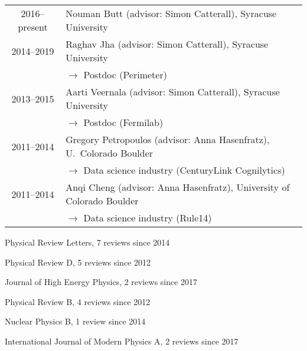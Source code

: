 \documentclass[10 pt]{article}
\renewcommand{\section}[2]%
    {\pagebreak[2]\vspace{1.3\baselineskip}%
     \hspace{0in}%
     \marginpar{
     \raggedright \scshape #1}#2}
\newenvironment{tightlistout}
  {\begin{list} {} {\setlength{\topsep}{-8 pt} \setlength{\itemsep}{-3 pt} \setlength{\leftmargin}{0 mm}}}{\end{list}}
\newcommand{\blankline}{\quad\pagebreak[2]}
\newcommand{\spacer}{\blankline\vspace{12 pt}\blankline}
\newcommand{\lra}{\ensuremath{\longrightarrow} }
\begin{document}
\vspace{-12 pt} %
\begin{tabular}[t]{cl}
  2016--present & Nouman Butt (advisor: Simon Catterall), Syracuse University           \\
  2014--2019    & Raghav Jha (advisor: Simon Catterall), Syracuse University            \\
                & \qquad \lra Postdoc (Perimeter)                                       \\[6 pt]
  2013--2015    & Aarti Veernala (advisor: Simon Catterall), Syracuse University        \\
                & \qquad \lra Postdoc (Fermilab)                                        \\[6 pt]
  2011--2014    & Gregory Petropoulos (advisor: Anna Hasenfratz), U.~Colorado Boulder   \\
                & \qquad \lra Data science industry (CenturyLink Cognilytics)           \\[6 pt]
  2011--2014    & Anqi Cheng (advisor: Anna Hasenfratz), University of Colorado Boulder \\
                & \qquad \lra Data science industry (Rule14)                            \\
\end{tabular}

\spacer



\section{Journal referee} %

\vspace{-12 pt} %
\begin{tightlistout} %
  \item Physical Review Letters, 7 reviews since 2014
  \item Physical Review D, 5 reviews since 2012
  \item Journal of High Energy Physics, 2 reviews since 2017
  \item Physical Review B, 4 reviews since 2012
  \item Nuclear Physics B, 1 review since 2014
  \item International Journal of Modern Physics A, 2 reviews since 2017
\end{tightlistout}
\end{document}
